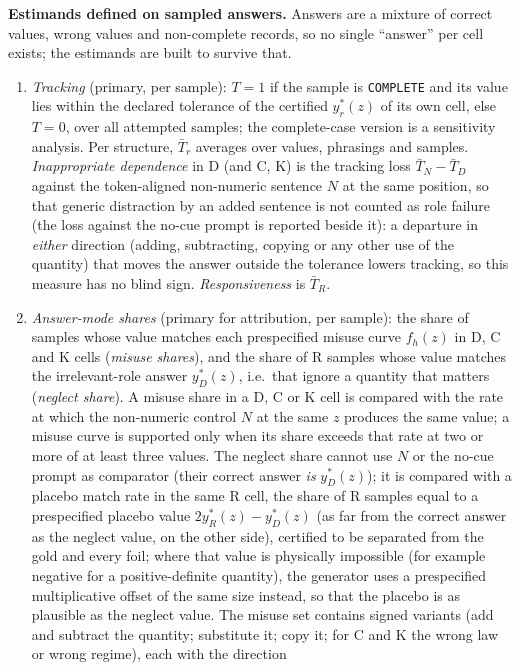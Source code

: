 \documentclass[10pt,a4paper]{article}
\begin{document}
\textbf{Estimands defined on sampled answers.} Answers are a mixture of correct values, wrong values and
non-complete records, so no single ``answer'' per cell exists; the estimands are built to survive that.
\begin{enumerate}
\item \emph{Tracking} (primary, per sample): $T=1$ if the sample is \texttt{COMPLETE} and its value lies within the
declared tolerance of the certified $y^*_r(z)$ of its own cell, else $T=0$, over all attempted samples; the
complete-case version is a sensitivity analysis. Per structure, $\bar T_r$ averages over values, phrasings and
samples. \emph{Inappropriate dependence} in D (and C, K) is the tracking loss $\bar T_N-\bar T_D$ against the
token-aligned non-numeric sentence $N$ at the same position, so that generic distraction by an added sentence is
not counted as role failure (the loss against the no-cue prompt is reported beside it): a departure in
\emph{either} direction (adding, subtracting, copying or any other use of the quantity) that moves the answer
outside the tolerance lowers tracking, so this measure has no blind sign. \emph{Responsiveness} is $\bar T_R$.
\item \emph{Answer-mode shares} (primary for attribution, per sample): the share of samples whose value matches
each prespecified misuse curve $f_h(z)$ in D, C and K cells (\emph{misuse shares}), and the share of R samples whose
value matches the irrelevant-role answer $y^*_D(z)$, i.e.\ that ignore a quantity that matters (\emph{neglect
share}). A misuse share in a D, C or K cell is compared with the rate at which the non-numeric control $N$ at the
same $z$ produces the same value; a misuse curve is supported only when its share exceeds that rate at two or more
of at least three values. The neglect share cannot use $N$ or the no-cue prompt as comparator (their correct answer
\emph{is} $y^*_D(z)$); it is compared with a placebo match rate in the same R cell, the share of R samples equal to a
prespecified placebo value $2y^*_R(z)-y^*_D(z)$ (as far from the correct answer as the neglect value, on the other
side), certified to be separated from the gold and every foil; where that value is physically impossible (for
example negative for a positive-definite quantity), the generator uses a prespecified multiplicative offset of the
same size instead, so that the placebo is as plausible as the neglect value. The misuse set contains signed variants (add and
subtract the quantity; substitute it; copy it; for C and K the wrong law or wrong regime), each with the direction

\end{enumerate}
\end{document}
